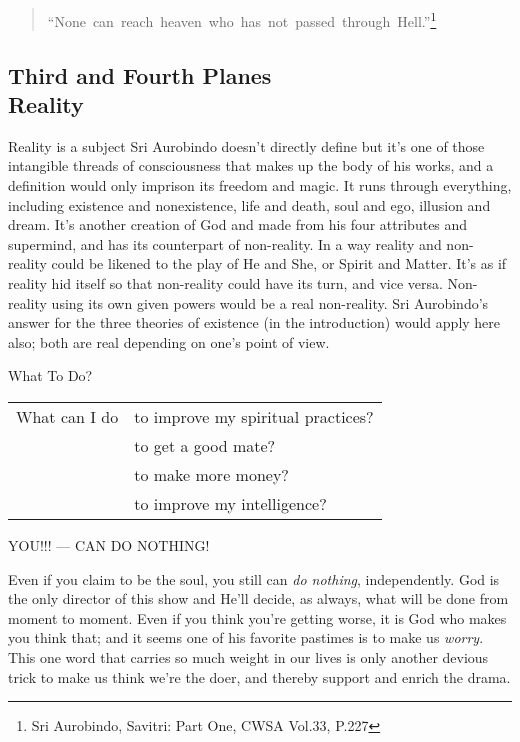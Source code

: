 \documentclass[12pt,a4paper]{book}
\begin{document}
\begin{verse}
\hspace{-1.1cm}
``None~can~reach~heaven~who~has~not~passed~through~Hell.''\footnote{Sri Aurobindo, Savitri: Part One, CWSA Vol.33, P.227}
\end{verse}


\newpage
\begin{center}\section*{Third and Fourth Planes\\Reality}\end{center}

Reality is a subject Sri Aurobindo doesn't directly define but it's
one of those intangible threads of consciousness that makes up the
body of his works, and a definition would only imprison its freedom
and magic. It runs through everything, including existence and
nonexistence, life and death, soul and ego, illusion and dream. It's
another creation of God and made from his four attributes and
supermind, and has its counterpart of non-reality. In a way reality and
non-reality could be likened to the play of He and She, or Spirit and
Matter. It's as if reality hid itself so that non-reality could have
its turn, and vice versa. Non-reality using its own given powers would
be a real non-reality. Sri Aurobindo's answer for the three theories of
existence (in the introduction) would apply here also; both are real
depending on one's point of view.

\noindent What To Do?

\noindent \hspace{-2mm}\begin{tabular}{ll}
What can I do &to improve my spiritual practices?\\
\ 	      &to get a good mate?\\
\             &to make more money?\\
\             &to improve my intelligence?\\
\end{tabular}

\noindent YOU!!! --- CAN DO NOTHING!

\noindent Even if you claim to be the soul, you still can \emph{do
  nothing}, independently. God is the only director of this show and
He'll decide, as always, what will be done from moment to moment. Even
if you think you're getting worse, it is God who makes you think that;
and it seems one of his favorite pastimes is to make us \emph{worry}. This
one word that carries so much weight in our lives is only another
devious trick to make us think we're the doer, and thereby support and
enrich the drama.
\end{document}
